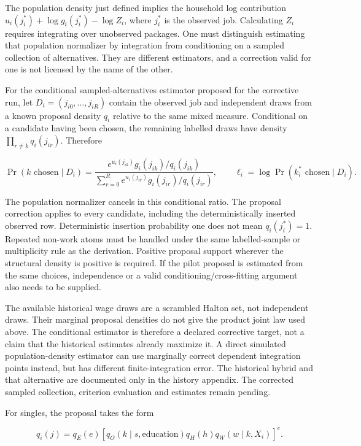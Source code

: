 \documentclass[11pt,a4paper]{article}
\begin{document}
The population density just defined implies the household log contribution \(u_i(j_i^*)+\log g_i(j_i^*)-\log Z_i\), where \(j_i^*\) is the observed job. Calculating \(Z_i\) requires integrating over unobserved packages. One must distinguish estimating that population normalizer by integration from conditioning on a sampled collection of alternatives. They are different estimators, and a correction valid for one is not licensed by the name of the other.

For the conditional sampled-alternatives estimator proposed for the corrective run, let \(D_i=(j_{i0},\ldots,j_{iR})\) contain the observed job and independent draws from a known proposal density \(q_i\) relative to the same mixed measure. Conditional on a candidate having been chosen, the remaining labelled draws have density \(\prod_{r\ne k}q_i(j_{ir})\). Therefore

\[\Pr(k\text{ chosen}\mid D_i)=
\frac{e^{u_i(j_{ik})}g_i(j_{ik})/q_i(j_{ik})}
{\sum_{r=0}^R e^{u_i(j_{ir})}g_i(j_{ir})/q_i(j_{ir})},\qquad
\ell_i=\log\Pr(k_i^*\text{ chosen}\mid D_i).\]

The population normalizer cancels in this conditional ratio. The proposal correction applies to every candidate, including the deterministically inserted observed row. Deterministic insertion probability one does not mean \(q_i(j_i^*)=1\). Repeated non-work atoms must be handled under the same labelled-sample or multiplicity rule as the derivation. Positive proposal support wherever the structural density is positive is required. If the pilot proposal is estimated from the same choices, independence or a valid conditioning/cross-fitting argument also needs to be supplied.

The available historical wage draws are a scrambled Halton set, not independent draws. Their marginal proposal densities do not give the product joint law used above. The conditional estimator is therefore a declared corrective target, not a claim that the historical estimates already maximize it. A direct simulated population-density estimator can use marginally correct dependent integration points instead, but has different finite-integration error. The historical hybrid and that alternative are documented only in the history appendix. The corrected sampled collection, criterion evaluation and estimates remain pending.

For singles, the proposal takes the form

\[q_i(j)=q_E(e)\left[q_O(k\mid s,\text{education})q_H(h)q_W(w\mid k,X_i)\right]^e.\]
\end{document}
